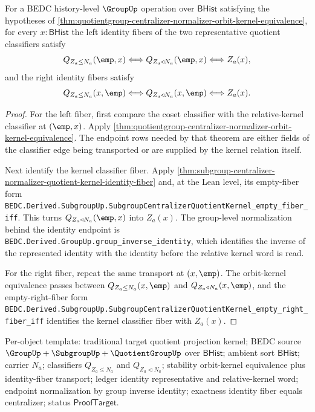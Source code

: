 \begin{theorem}
\label{thm:quotientgroup-centralizer-normalizer-identity-fiber}
For a BEDC history-level $\GroupUp$ operation over $\mathsf{BHist}$
satisfying the hypotheses of
\autoref{thm:quotientgroup-centralizer-normalizer-orbit-kernel-equivalence},
for every $x:\mathsf{BHist}$ the left identity fibers of the two
representative quotient classifiers satisfy
$$
Q_{Z_a\leq N_a}(\emp,x)
\Longleftrightarrow
Q_{Z_a\triangleleft N_a}(\emp,x)
\Longleftrightarrow
Z_a(x),
$$
and the right identity fibers satisfy
$$
Q_{Z_a\leq N_a}(x,\emp)
\Longleftrightarrow
Q_{Z_a\triangleleft N_a}(x,\emp)
\Longleftrightarrow
Z_a(x).
$$
\end{theorem}
\begin{proof}
For the left fiber, first compare the coset classifier with the relative-kernel
classifier at $(\emp,x)$. Apply
\autoref{thm:quotientgroup-centralizer-normalizer-orbit-kernel-equivalence}.
The endpoint rows needed by that theorem are either fields of the classifier
edge being transported or are supplied by the kernel relation itself.

Next identify the kernel classifier fiber. Apply
\autoref{thm:subgroup-centralizer-normalizer-quotient-kernel-identity-fiber}
and, at the Lean level, its empty-fiber form
\texttt{BEDC.Derived.SubgroupUp.SubgroupCentralizerQuotientKernel\_empty\_fiber\_iff}.
This turns
$Q_{Z_a\triangleleft N_a}(\emp,x)$ into $Z_a(x)$. The group-level
normalization behind the identity endpoint is
\texttt{BEDC.Derived.GroupUp.group\_inverse\_identity}, which identifies the
inverse of the represented identity with the identity before the relative
kernel word is read.

For the right fiber, repeat the same transport at $(x,\emp)$. The orbit-kernel
equivalence passes between $Q_{Z_a\leq N_a}(x,\emp)$ and
$Q_{Z_a\triangleleft N_a}(x,\emp)$, and the empty-right-fiber form
\texttt{BEDC.Derived.SubgroupUp.SubgroupCentralizerQuotientKernel\_empty\_right\_fiber\_iff}
identifies the kernel classifier fiber with $Z_a(x)$.
\end{proof}

Per-object template: traditional target quotient projection kernel; BEDC
source $\GroupUp+\SubgroupUp+\QuotientGroupUp$ over $\mathsf{BHist}$; ambient
sort $\mathsf{BHist}$; carrier $N_a$; classifiers
$Q_{Z_a\leq N_a}$ and $Q_{Z_a\triangleleft N_a}$; stability orbit-kernel
equivalence plus identity-fiber transport; ledger identity representative and
relative-kernel word; endpoint normalization by group inverse identity;
exactness identity fiber equals centralizer; status $\mathsf{ProofTarget}$.
